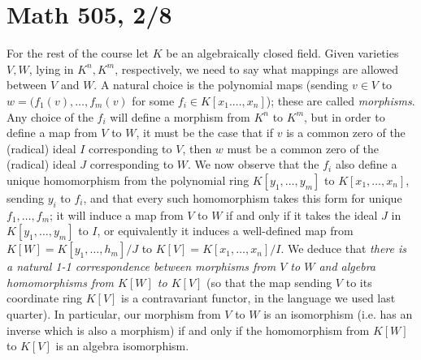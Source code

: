 \documentclass[10pt]{article}
\begin{document}
\section*{Math 505, 2/8}

For the rest of the course let $K$ be an algebraically closed field.
Given varieties $V,W$, lying in $K^n,K^m$, respectively, we need to say
what mappings are allowed between $V$ and $W$. A natural choice is the
polynomial maps (sending $v\in V$ to $w=(f_1(v),\ldots,f_m(v)$ for some
$f_i\in K[x_1.\ldots,x_n]$); these are called {\sl morphisms}. Any
choice of the $f_i$ will define a morphism from $K^n$ to $K^m$, but in
order to define a map from $V$ to $W$, it must be the case that if $v$
is a common zero of the (radical) ideal $I$ corresponding to $V$, then
$w$ must be a common zero of the (radical) ideal $J$ corresponding to
$W$. We now observe that the $f_i$ also define a unique homomorphism
from the polynomial ring $K[y_1,\ldots,y_m]$ to $K[x_1,\ldots,x_n]$,
sending $y_i$ to $f_i$, and that every such homomorphism takes this form
for unique $f_1,\ldots,f_m$; it will induce a map from $V$ to $W$ if and
only if it takes the ideal $J$ in $K[y_1,\ldots,y_m]$ to $I$, or
equivalently it induces a well-defined map from $K[W] =
K[y_1,\ldots,h_m]/J$ to $K[V] = K[x_1,\ldots,x_n]/I$. We deduce that
{\sl there is a natural 1-1 correspondence between morphisms from $V$ to
  $W$ and algebra homomorphisms from $K[W]$ to $K[V]$} (so that the map
sending $V$ to its coordinate ring $K[V]$ is a contravariant functor, in
the language we used last quarter). In particular, our morphism from $V$
to $W$ is an isomorphism (i.e. has an inverse which is also a morphism)
if and only if the homomorphism from $K[W]$ to $K[V]$ is an algebra
isomorphism.
\end{document}
